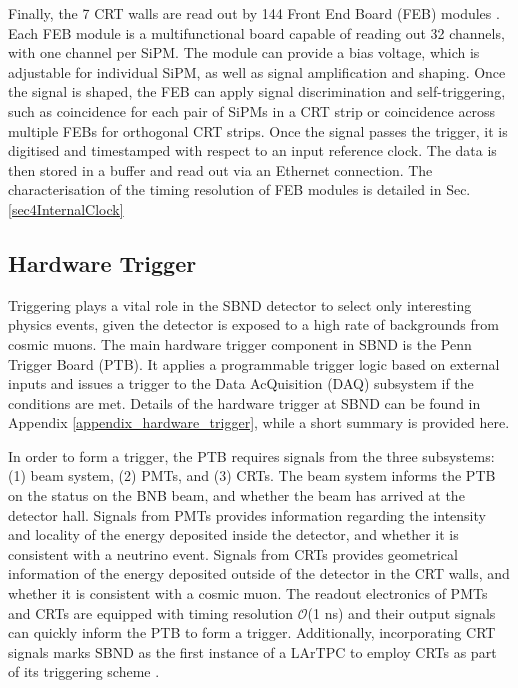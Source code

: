 Finally, the 7 CRT walls are read out by 144 Front End Board (FEB) modules \cite{crt_note}.%
Each FEB module is a multifunctional board capable of reading out 32 channels, with one channel per SiPM. 
The module can provide a bias voltage, which is adjustable for individual SiPM, as well as signal amplification and shaping.
Once the signal is shaped, the FEB can apply signal discrimination and self-triggering, such as coincidence for each pair of SiPMs in a CRT strip or coincidence across multiple FEBs for orthogonal CRT strips. 
Once the signal passes the trigger, it is digitised and timestamped with respect to an input reference clock. 
The data is then stored in a buffer and read out via an Ethernet connection. 
The characterisation of the timing resolution of FEB modules is detailed in Sec. \ref{sec4InternalClock}

\subsection{Hardware Trigger}
\label{sec:sbnd_trigger}

Triggering plays a vital role in the SBND detector to select only interesting physics events, given the detector is exposed to a high rate of backgrounds from cosmic muons. 
The main hardware trigger component in SBND is the Penn Trigger Board (PTB).
It applies a programmable trigger logic based on external inputs and issues a trigger to the Data AcQuisition (DAQ) subsystem if the conditions are met.
Details of the hardware trigger at SBND can be found in Appendix \ref{appendix_hardware_trigger}, while a short summary is provided here.

In order to form a trigger, the PTB requires signals from the three subsystems: (1) beam system, (2) PMTs, and (3) CRTs.
The beam system informs the PTB on the status on the BNB beam, and whether the beam has arrived at the detector hall.
Signals from PMTs provides information regarding the intensity and locality of the energy deposited inside the detector, and whether it is consistent with a neutrino event.
Signals from CRTs provides geometrical information of the energy deposited outside of the detector in the CRT walls, and whether it is consistent with a cosmic muon. 
The readout electronics of PMTs and CRTs are equipped with timing resolution $\mathcal{O}$(1 ns) and their output signals can quickly inform the PTB to form a trigger.
Additionally, incorporating CRT signals marks SBND as the first instance of a LArTPC to employ CRTs as part of its triggering scheme \cite{CPAD2022}.

